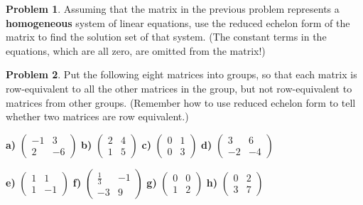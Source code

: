\documentclass[12pt]{article}
\theoremstyle{definition}
\newtheorem{problem}{Problem}
\newenvironment{answer}{\par\bigskip\bgroup\color{darkblue}}{\egroup}
\begin{document}
\begin{problem} 
Assuming that the matrix in the previous problem represents a \textbf{homogeneous} system of linear equations,
use the reduced echelon form of the matrix to find the solution set of that system.  (The constant terms in the
equations, which are all zero, are omitted from the matrix!)
\end{problem}


\begin{answer}
\end{answer}


\begin{problem}
Put the following eight matrices into groups, so that each matrix is row-equivalent to all the other
matrices in the group, but not row-equivalent to matrices from other groups.  (Remember how to use
reduced echelon form to tell whether two matrices are row equivalent.)

\bigskip
\centerline{
   \textbf{a)} $\begin{pmatrix} -1& 3 \\ 2 &-6\end{pmatrix}$ \hskip 0.3in
   \textbf{b)} $\begin{pmatrix} 2 & 4 \\ 1 & 5 \end{pmatrix}$ \hskip 0.3in
   \textbf{c)} $\begin{pmatrix} 0 & 1 \\ 0 & 3 \end{pmatrix}$ \hskip 0.3in
   \textbf{d)} $\begin{pmatrix} 3 & 6 \\ -2 & -4 \end{pmatrix}$ \hskip 0.3in
}

\bigskip
\centerline{
   \textbf{e)} $\begin{pmatrix} 1 & 1 \\ 1 & -1 \end{pmatrix}$ \hskip 0.3in
   \textbf{f)} $\begin{pmatrix} \frac{1}{3} & -1 \\ -3 & 9\end{pmatrix}$ \hskip 0.3in
   \textbf{g)} $\begin{pmatrix} 0 & 0 \\ 1 & 2 \end{pmatrix}$ \hskip 0.3in
   \textbf{h)} $\begin{pmatrix} 0 & 2 \\ 3 & 7 \end{pmatrix}$ \hskip 0.3in
}

\end{problem}
\end{document}
